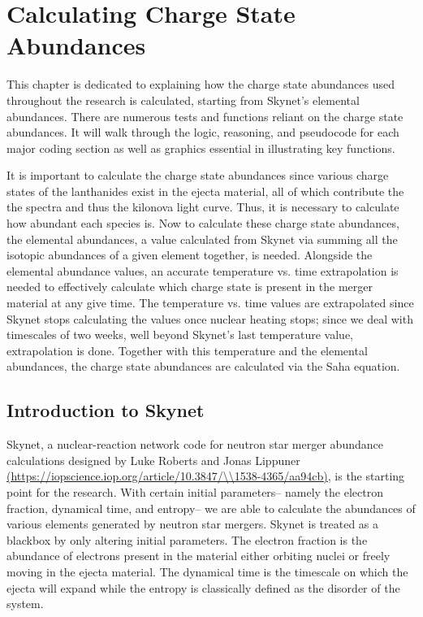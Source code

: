 \documentclass[11pt,a4paper]{article}
\begin{document}
\pagebreak

\section{Calculating Charge State Abundances}

This chapter is dedicated to explaining how the charge state abundances used throughout the research is calculated, starting from Skynet’s elemental abundances. There are numerous tests and functions reliant on the charge state abundances. It will walk through the logic, reasoning, and pseudocode for each major coding section as well as graphics essential in illustrating key functions. 

It is important to calculate the charge state abundances since various charge states of the lanthanides exist in the ejecta material, all of which contribute the the spectra and thus the kilonova light curve. Thus, it is necessary to calculate how abundant each species is. Now to calculate these charge state abundances, the elemental abundances, a value calculated from Skynet via summing all the isotopic abundances of a given element together, is needed. Alongside the elemental abundance values, an accurate temperature vs. time extrapolation is needed to effectively calculate which charge state is present in the merger material at any give time. The temperature vs. time values are extrapolated since Skynet stops calculating the values once nuclear heating stops; since we deal with timescales of two weeks, well beyond Skynet's last temperature value, extrapolation is done. Together with this temperature and the elemental abundances, the charge state abundances are calculated via the Saha equation. 

\subsection{Introduction to Skynet}

Skynet, a nuclear-reaction network code for neutron star merger abundance calculations designed by Luke Roberts and Jonas Lippuner \url{(https://iopscience.iop.org/article/10.3847/\\1538-4365/aa94cb)}, is the starting point for the research. With certain initial parameters-- namely the electron fraction, dynamical time, and entropy-- we are able to calculate the abundances of various elements generated by neutron star mergers. Skynet is treated as a blackbox by only altering initial parameters. The electron fraction is the abundance of electrons present in the material either orbiting nuclei or freely moving in the ejecta material. The dynamical time is the timescale on which the ejecta will expand while the entropy is classically defined as the disorder of the system.
\end{document}
